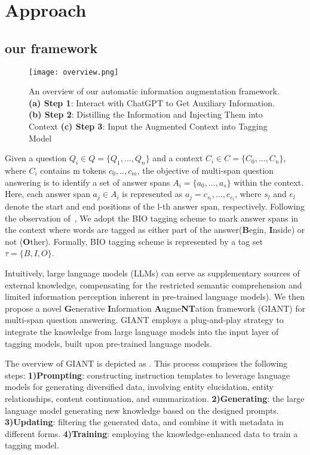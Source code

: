 \section{Approach}
\subsection{our framework}
\begin{figure*}[h]
	\centering
	\texttt{[image: overview.png]}
	\caption{An overview of our automatic information augmentation framework. \textbf{(a) Step 1}: Interact with ChatGPT to Get Auxiliary Information. \textbf{(b) Step 2}: Distilling the Information and Injecting Them into Context \textbf{(c) Step 3}: Input the Augmented Context into Tagging Model}
	\label{fig:overview}
\end{figure*}   

 Given a question $Q_i \in Q = \{Q_1,...,Q_n\}$ and a context $C_i \in C = \{C_0,...,C_n\}$, where $C_i$ contains m tokens $c_0,..,c_m$, the objective of multi-span question answering is to identify a set of answer spans $A_i = \{a_0,...,a_s\}$ within the context. Here, each answer span $a_j \in A_i$ is represented as $a_j = c_{s_l},...,c_{e_l}$, where $s_l$ and $e_l$ denote the start and end positions of the l-th answer span, respectively.
 Following the observation of~\cite{li2022multispanqa}, We adopt the BIO tagging scheme to mark answer spans in the context where words are tagged as either part of the answer(\textbf{B}egin, \textbf{I}nside) or not (\textbf{O}ther). Formally, BIO tagging scheme is represented by a tag set $\tau = \{B, I, O\}$.

 Intuitively, large language models (LLMs) can serve as supplementary sources of external knowledge, compensating for the restricted semantic comprehension and limited information perception inherent in pre-trained language models). 
 We then propose a novel \textbf{G}enerative \textbf{I}nformation \textbf{A}ugme\textbf{NT}ation framework (GIANT) for multi-span question answering.
 GIANT employs a plug-and-play strategy to integrate the knowledge from large language models into the input layer of tagging models, built upon pre-trained language models.
 
 
 The overview of GIANT is depicted as .
 This process comprises the following steps:
 \textbf{1)Prompting}: constructing instruction templates to leverage language models for generating diversified data, involving entity elucidation, entity relationships, content continuation, and summarization.
 \textbf{2)Generating}: the large language model generating new knowledge based on the designed prompts.
 \textbf{3)Updating}: filtering the generated data, and combine it with metadata in different forms.
 \textbf{4)Training}: employing the knowledge-enhanced data to train a tagging model.

